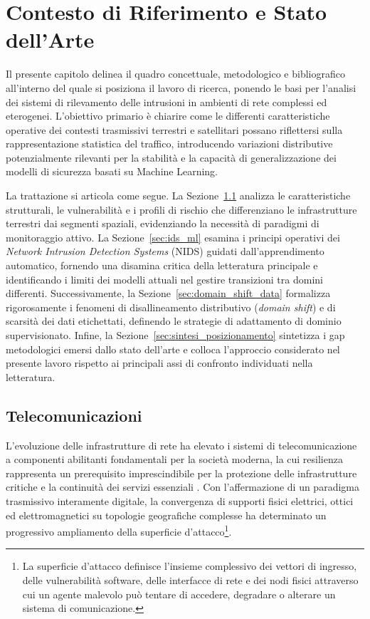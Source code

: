 \chapter{Contesto di Riferimento e Stato dell'Arte}
\label{ch:bck_rltd_wrks}

Il presente capitolo delinea il quadro concettuale, metodologico e bibliografico all'interno del quale si posiziona il lavoro di ricerca, ponendo le basi per l'analisi dei sistemi di rilevamento delle intrusioni in ambienti di rete complessi ed eterogenei. 
L'obiettivo primario è chiarire come le differenti caratteristiche operative dei contesti trasmissivi terrestri e satellitari possano riflettersi sulla rappresentazione statistica del traffico, introducendo variazioni distributive potenzialmente rilevanti per la stabilità e la capacità di generalizzazione dei modelli di sicurezza basati su Machine Learning.

La trattazione si articola come segue. 
La Sezione~\ref{sec:telecomunicazioni} analizza le caratteristiche strutturali, le vulnerabilità e i profili di rischio che differenziano le infrastrutture terrestri dai segmenti spaziali, evidenziando la necessità di paradigmi di monitoraggio attivo. 
La Sezione~\ref{sec:ids_ml} esamina i principi operativi dei \textit{Network Intrusion Detection Systems} (NIDS) guidati dall'apprendimento automatico, fornendo una disamina critica della letteratura principale e identificando i limiti dei modelli attuali nel gestire transizioni tra domini differenti. 
Successivamente, la Sezione~\ref{sec:domain_shift_data} formalizza rigorosamente i fenomeni di disallineamento distributivo (\textit{domain shift}) e di scarsità dei dati etichettati, definendo le strategie di adattamento di dominio supervisionato. 
Infine, la Sezione~\ref{sec:sintesi_posizionamento} sintetizza i gap metodologici emersi dallo stato dell'arte e colloca l'approccio considerato nel presente lavoro rispetto ai principali assi di confronto individuati nella letteratura.

\section{Telecomunicazioni}
\label{sec:telecomunicazioni}

L'evoluzione delle infrastrutture di rete ha elevato i sistemi di telecomunicazione a componenti abilitanti fondamentali per la società moderna, la cui resilienza rappresenta un prerequisito imprescindibile per la protezione delle infrastrutture critiche e la continuità dei servizi essenziali \cite{tanenbaum2020}. 
Con l'affermazione di un paradigma trasmissivo interamente digitale, la convergenza di supporti fisici elettrici, ottici ed elettromagnetici su topologie geografiche complesse ha determinato un progressivo ampliamento della superficie d'attacco\footnote{La superficie d'attacco definisce l'insieme complessivo dei vettori di ingresso, delle vulnerabilità software, delle interfacce di rete e dei nodi fisici attraverso cui un agente malevolo può tentare di accedere, degradare o alterare un sistema di comunicazione.}.

